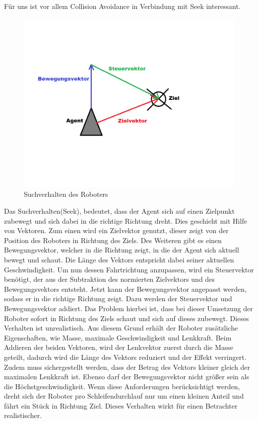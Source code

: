 Für uns ist vor allem Collision Avoidance in Verbindung mit Seek interessant.
\begin{figure}[h]
	\centering
	\includegraphics[height=0.3\pageheight,keepaspectratio]{pics/Seeking} 
	\caption{Suchverhalten des Roboters}
\end{figure}
Das Suchverhalten(Seek), bedeutet, dass der Agent sich auf einen Zielpunkt zubewegt und sich dabei in die richtige Richtung dreht. Dies geschieht mit Hilfe von Vektoren.
Zum einen wird ein Zielvektor genutzt, dieser zeigt von der Position des Roboters in Richtung des Ziels. Des Weiteren gibt es einen Bewegungsvektor, welcher in die Richtung zeigt, in die der Agent sich aktuell bewegt und schaut. Die Länge des Vektors entspricht dabei seiner aktuellen Geschwindigkeit. 
Um nun dessen Fahrtrichtung anzupassen, wird ein Steuervektor benötigt, der aus der Subtraktion des normierten Zielvektors und des Bewegungsvektors entsteht. Jetzt kann der Bewegungsvektor angepasst werden, sodass er in die richtige Richtung zeigt. Dazu werden der Steuervektor und Bewegungsvektor addiert. Das Problem hierbei ist, dass bei dieser Umsetzung der Roboter sofort in Richtung des Ziels schaut und sich auf dieses zubewegt. Dieses Verhalten ist unrealistisch. Aus diesem Grund erhält der Roboter zusätzliche Eigenschaften, wie Masse, maximale Geschwindigkeit und Lenkkraft. Beim Addieren der beiden Vektoren, wird der Lenkvektor zuerst durch die Masse geteilt, dadurch wird die Länge des Vektors reduziert und der Effekt verringert. Zudem muss sichergestellt werden, dass der Betrag des Vektors kleiner gleich der maximalen Lenkkraft ist. Ebenso darf der Bewegungsvektor nicht größer sein als die Höchstgeschwindigkeit. Wenn diese Anforderungen berücksichtigt werden, dreht sich der Roboter pro Schleifendurchlauf nur um einen kleinen Anteil und fährt ein Stück in Richtung Ziel. Dieses Verhalten wirkt für einen Betrachter realistischer. 
